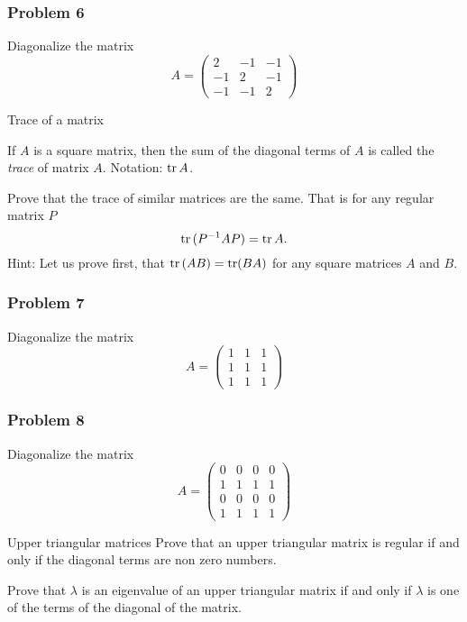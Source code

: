 \begin{frame}
    \frametitle{Problem 6}
    Diagonalize the matrix
    \[
        A=
        \begin{pmatrix}
            2&-1&-1\\-1&2&-1\\-1&-1&2
        \end{pmatrix}
    \]
\end{frame}

\begin{frame}{Trace of a matrix}
    \begin{definition}
        If $A$ is a square matrix, then the sum of the diagonal terms of $A$ is called the \emph{trace}
        of matrix $A$.
        Notation: $\operatorname{tr}{A}$.
    \end{definition}

    Prove that the trace of similar matrices are the same. 
    That is for any regular matrix $P$
    \[
        \operatorname{tr}{(P^{-1}AP)}=\operatorname{tr}{A}.
    \]
    Hint: Let us prove first, that $\operatorname{tr}\left( AB \right)=\operatorname{tr}(BA)$ for any square matrices $A$ and $B$.
\end{frame}

\begin{frame}
    \frametitle{Problem 7}
    Diagonalize the matrix
    \[
        A=
        \begin{pmatrix}
            1&1&1\\1&1&1\\1&1&1
        \end{pmatrix}
    \]
\end{frame}

\begin{frame}
    \frametitle{Problem 8}
    Diagonalize the matrix
    \[
        A=
        \begin{pmatrix}
            0&0&0&0\\1&1&1&1\\0&0&0&0\\1&1&1&1
        \end{pmatrix}
    \]
\end{frame}

\begin{frame}{Upper triangular matrices}
    Prove that an upper triangular matrix is regular if and only if the diagonal terms are non zero numbers.

    Prove that $\lambda$ is an eigenvalue of an upper triangular matrix if and only if $\lambda$ is one of the terms of the diagonal of the matrix.
\end{frame}

